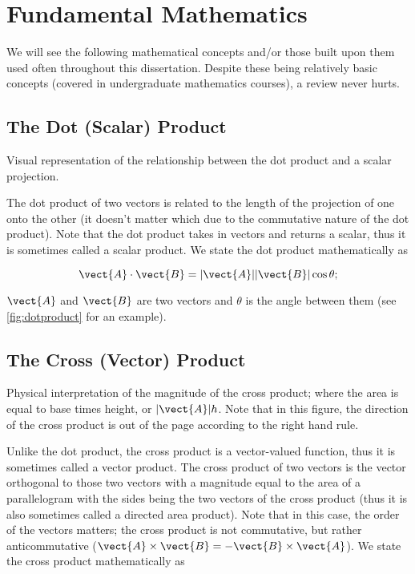 \section{Fundamental Mathematics}

We will see the following mathematical concepts and/or those built upon them used often throughout this dissertation.
%
Despite these being relatively basic concepts (covered in undergraduate mathematics courses), a review never hurts.

\subsection{The Dot (Scalar) Product}

\begin{marginfigure}
    \centering
        
        \caption[Visual dot and scalar product.]{Visual representation of the relationship between the dot product and a scalar projection.}
    \label{fig:dotproduct}
\end{marginfigure}
The dot product of two vectors is related to the length of the projection of one onto the other (it doesn't matter which due to the commutative nature of the dot product).
%
Note that the dot product takes in vectors and returns a scalar, thus it is sometimes called a scalar product.
%
We state the dot product mathematically as

\begin{equation}
    \label{eqn:dotproduct}
    \vect{A} \cdot \vect{B} = |\vect{A}||\vect{B}| \cos \theta;
\end{equation}

\where \(\vect{A}\) and \(\vect{B}\) are two vectors and \(\theta\) is the angle between them (see \cref{fig:dotproduct} for an example).

\subsection{The Cross (Vector) Product}

\begin{marginfigure}
    \centering
        
        \caption[Visual cross product.]{Physical interpretation of the magnitude of the cross product; where the area is equal to base times height, or \(|\vect{A}| h\). Note that in this figure, the direction of the cross product is out of the page according to the right hand rule.}
    \label{fig:crossproduct}
\end{marginfigure}
Unlike the dot product, the cross product is a vector-valued function, thus it is sometimes called a vector product.
%
The cross product of two vectors is the vector orthogonal to those two vectors with a magnitude equal to the area of a parallelogram with the sides being the two vectors of the cross product (thus it is also sometimes called a directed area product).
%
Note that in this case, the order of the vectors matters; the cross product is not commutative, but rather anticommutative (\(\vect{A} \times \vect{B} = - \vect{B} \times \vect{A}\)).
%
We state the cross product mathematically as

